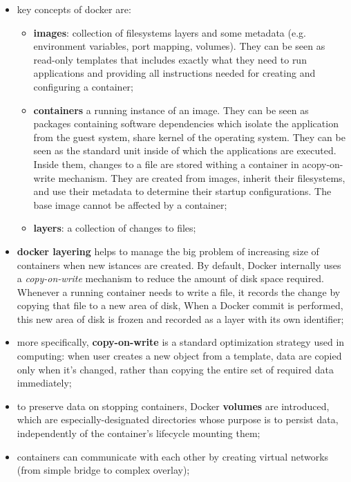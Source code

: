 \documentclass[oneside]{article}
\begin{document}
\begin{itemize}
    \item key concepts of docker are:
        \begin{itemize}
            \item \textbf{images}: collection of filesystems layers and some metadata (e.g. environment variables, port mapping, volumes). They can be seen as read-only templates that includes exactly what they need to run applications and providing all instructions needed for creating and configuring a container;
            \item \textbf{containers} a running instance of an image. They can be seen as packages containing software dependencies which isolate the application from the guest system, share kernel of the operating system. They can be seen as the standard unit inside of which the applications are executed. Inside them, changes to a file are stored withing a container in acopy-on-write mechanism. They are created from images, inherit their filesystems, and use their metadata to determine their startup configurations. The base image cannot be affected by a container;
            \item \textbf{layers}: a collection of changes to files;
        \end{itemize}
    \item \textbf{docker layering} helps to manage the big problem of increasing size of containers when new istances are created. By default, Docker internally uses a \textit{copy-on-write} mechanism to reduce the amount of disk space required. Whenever a running container needs to write a file, it records the change by copying that file to a new area of disk, When a Docker commit is performed, this new area of disk is frozen and recorded as a layer with its own identifier;
    
    \item more specifically, \textbf{copy-on-write} is a standard optimization strategy used in computing: when user creates a new object from a template, data are copied only when it's changed, rather than copying the entire set of required data immediately;
    
    \item to preserve data on stopping containers, Docker \textbf{volumes} are introduced, which are especially-designated directories whose purpose is to persist data, independently of the container's lifecycle mounting them;
    
    \item containers can communicate with each other by creating virtual networks (from simple bridge to complex overlay);
    

\end{itemize}
\end{document}
